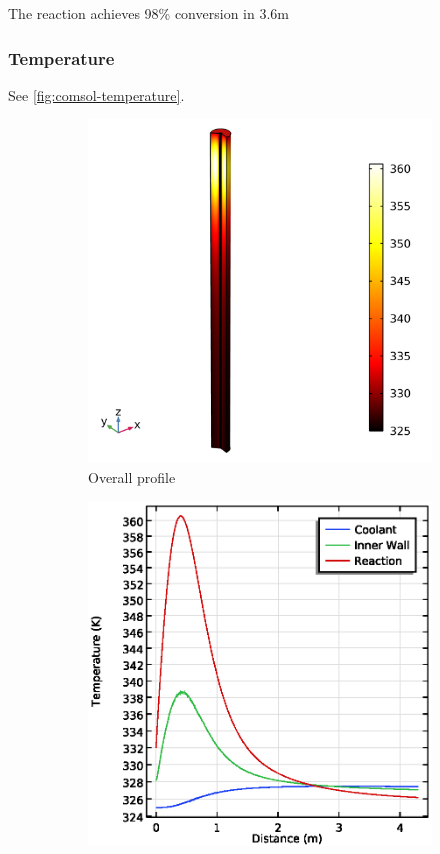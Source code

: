 The reaction achieves 98\% conversion in 3.6m 

\subsubsection{Temperature}
See \cref{fig:comsol-temperature}.

\begin{figure}[h]
    \centering

    \begin{subfigure}{0.32\linewidth}
        \includegraphics[width=\linewidth]{figures/temperature-surface.png}
        \caption{Overall profile}
        \label{fig:comsol-temperature:surface}
    \end{subfigure}
    \begin{subfigure}{0.32\linewidth}
        \includegraphics[width=\linewidth]{figures/temperature-lines.eps}

\end{subfigure}
\end{figure}
